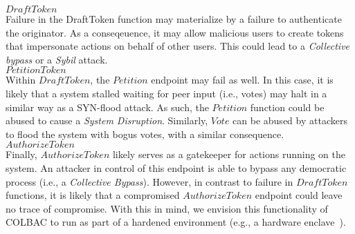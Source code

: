 \noindent$DraftToken$\mbox{}\\
Failure in the DraftToken function may materialize by a failure to authenticate
the originator. As a conseqeuence, it may allow malicious users to create tokens
that impersonate actions on behalf of other users. This could lead to a
\emph{Collective bypass} or a \emph{Sybil} attack.\\

\noindent$PetitionToken$\mbox{}\\
Within $DraftToken$, the $Petition$ endpoint may fail as well. In this case, it
is likely that a system stalled waiting for peer input (i.e., votes) may halt
in a similar way as a SYN-flood attack. As such, the $Petition$ function could
be abused to cause a \emph{System Disruption}. Similarly, $Vote$ can be abused
by attackers to flood the system with bogus votes, with a similar consequence.\\

\noindent$AuthorizeToken$\mbox{}\\
Finally, $AuthorizeToken$ likely serves as a gatekeeper for actions running on
the system. An attacker in control of this endpoint is able to bypass any
democratic process (i.e., a \emph{Collective Bypass}). However, in contrast to
failure in $DraftToken$ functions, it is likely that a compromised
$AuthorizeToken$ endpoint could leave no trace of compromise. With this in
mind, we envision this functionality of COLBAC to run as part of a hardened
environment (e.g., a hardware enclave~\cite{sgx}).
